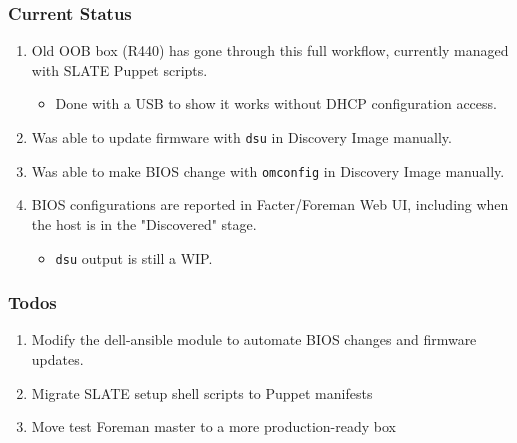\documentclass{beamer}
\begin{document}
\begin{frame}
 \frametitle{Current Status}
 \begin{enumerate}
  \item Old OOB box (R440) has gone through this full workflow, currently managed with SLATE Puppet scripts.
        \begin{itemize}
         \item Done with a USB to show it works without DHCP configuration access.
        \end{itemize}
  \item Was able to update firmware with \texttt{dsu} in Discovery Image manually.
  \item Was able to make BIOS change with \texttt{omconfig} in Discovery Image manually.
  \item BIOS configurations are reported in Facter/Foreman Web UI, including when the host is in the "Discovered" stage.
        \begin{itemize}
         \item \texttt{dsu} output is still a WIP.
        \end{itemize}
 \end{enumerate}

\end{frame}

\begin{frame}
 \frametitle{Todos}
 \begin{enumerate}
  \item Modify the dell-ansible module to automate BIOS changes and firmware updates.
  \item Migrate SLATE setup shell scripts to Puppet manifests
  \item Move test Foreman master to a more production-ready box
 \end{enumerate}

\end{frame}
\end{document}
